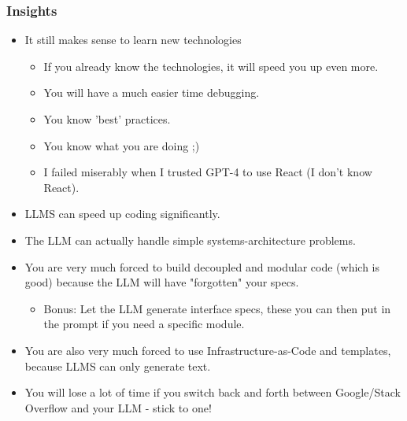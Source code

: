 \documentclass[t]{beamer}
\begin{document}
\begin{frame}
  \frametitle{Insights}
  \begin{itemize}
    \item It still makes sense to learn new technologies
    \begin{itemize}
        \item If you already know the technologies, it will speed you up even more.
        \item You will have a much easier time debugging.
        \item You know 'best' practices.
        \item You know what you are doing ;)
        \item I failed miserably when I trusted GPT-4 to use React (I don't know React).
    \end{itemize}
    \item LLMS can speed up coding significantly.
    \item The LLM can actually handle simple systems-architecture problems.
    \item You are very much forced to build decoupled and modular code (which is good) because the LLM will have "forgotten" your specs.
    \begin{itemize}
        \item Bonus: Let the LLM generate interface specs, these you can then put in the prompt if you need a specific module.
    \end{itemize}
    \item You are also very much forced to use Infrastructure-as-Code and templates, because LLMS can only generate text.
    \item You will lose a lot of time if you switch back and forth between Google/Stack Overflow and your LLM - stick to one!
\end{itemize}

  
\end{frame}
\end{document}
